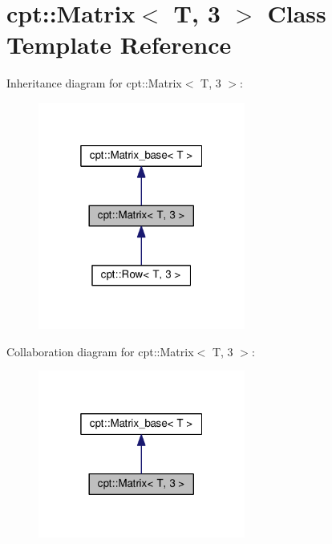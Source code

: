 \hypertarget{classcpt_1_1Matrix_3_01T_00_013_01_4}{}\section{cpt\+:\+:Matrix$<$ T, 3 $>$ Class Template Reference}
\label{classcpt_1_1Matrix_3_01T_00_013_01_4}


Inheritance diagram for cpt\+:\+:Matrix$<$ T, 3 $>$\+:
\nopagebreak
\begin{figure}[H]
\begin{center}
\leavevmode
\includegraphics[width=193pt]{classcpt_1_1Matrix_3_01T_00_013_01_4__inherit__graph}
\end{center}
\end{figure}


Collaboration diagram for cpt\+:\+:Matrix$<$ T, 3 $>$\+:
\nopagebreak
\begin{figure}[H]
\begin{center}
\leavevmode
\includegraphics[width=193pt]{classcpt_1_1Matrix_3_01T_00_013_01_4__coll__graph}
\end{center}
\end{figure}
